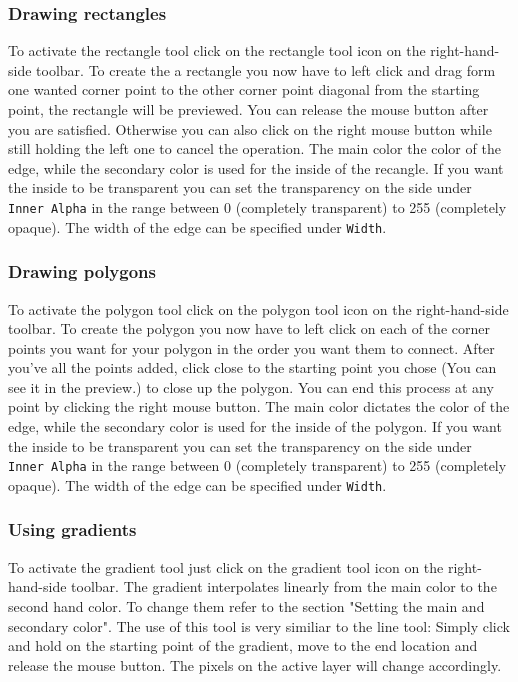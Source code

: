 \documentclass[a4paper, 12pt]{article}
\begin{document}
\subsubsection{Drawing rectangles}
To activate the rectangle tool click on the rectangle tool icon on the right-hand-side toolbar.
To create the a rectangle you now have to left click and drag form one wanted corner point to the other corner point diagonal from the starting point, the rectangle will be previewed. You can release the mouse button after you are satisfied.
Otherwise you can also click on the right mouse button while still holding the left one to cancel the operation.
The main color the color of the edge, while the secondary color is used for the inside of the recangle. If you want the inside to be transparent you can set the transparency on the side under \texttt{Inner Alpha} in the range between 0 (completely transparent) to 255 (completely opaque). The width of the edge can be specified under \texttt{Width}.

\subsubsection{Drawing polygons}
To activate the polygon tool click on the polygon tool icon on the right-hand-side toolbar.
To create the polygon you now have to left click on each of the corner points you want for your polygon in the order you want them to connect.
After you've all the points added, click close to the starting point you chose (You can see it in the preview.) to close up the polygon. You can end this process at any point by clicking the right mouse button.
The main color dictates the color of the edge, while the secondary color is used for the inside of the polygon. If you want the inside to be transparent you can set the transparency on the side under \texttt{Inner Alpha} in the range between 0 (completely transparent) to 255 (completely opaque). The width of the edge can be specified under \texttt{Width}.

\subsubsection{Using gradients}
To activate the gradient tool just click on the gradient tool icon on the right-hand-side toolbar. The gradient interpolates linearly from the main color to the second hand color. To change them refer to the section "Setting the main and secondary color".
The use of this tool is very similiar to the line tool: Simply click and hold on the starting point of the gradient, move to the end location and release the mouse button. The pixels on the active layer will change accordingly.
\end{document}

